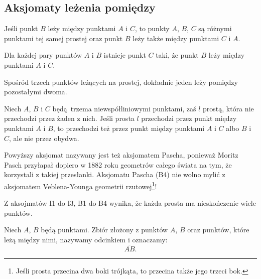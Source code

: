 %

\subsection{Aksjomaty leżenia pomiędzy}
\begin{axiom}
    Jeśli punkt $B$ leży między punktami $A$ i $C$, to punkty $A$, $B$, $C$ są różnymi punktami tej samej prostej oraz punkt $B$ leży także między punktami $C$ i $A$.
\end{axiom}

\begin{axiom}
    Dla każdej pary punktów $A$ i $B$ istnieje punkt $C$ taki, że punkt $B$ leży między punktami $A$ i $C$.
\end{axiom}

\begin{axiom}
    Spośród trzech punktów leżących na prostej, dokładnie jeden leży pomiędzy pozostałymi dwoma.
\end{axiom}

\begin{axiom}
    Niech $A$, $B$ i $C$ będą trzema niewspółliniowymi punktami, zaś $l$ prostą, która nie przechodzi przez żaden z nich.
    Jeśli prosta $l$ przechodzi przez punkt między punktami $A$ i $B$, to przechodzi też przez punkt między punktami $A$ i $C$ albo $B$ i $C$, ale nie przez obydwa.
\end{axiom}

Powyższy aksjomat nazywany jest też aksjomatem Pascha, ponieważ Moritz Pasch \cite{pasch_1882} przyłapał dopiero w 1882 roku geometrów całego świata na tym, że korzystali z takiej przesłanki.
%
%
Aksjomatu Pascha (B4) nie wolno mylić z aksjomatem Veblena-Younga geometrii rzutowej\footnote{Jeśli prosta przecina dwa boki trójkąta, to przecina także jego trzeci bok. }!

\begin{proposition}
    Z aksojmatów I1 do I3, B1 do B4 wynika, że każda prosta ma nieskończenie wiele punktów.
\end{proposition}

\begin{definition}[odcinek]
    Niech $A$, $B$ będą punktami.
    Zbiór złożony z punktów $A$, $B$ oraz punktów, które leżą między nimi, nazywamy odcinkiem i oznaczamy:
%
    \begin{equation}
        \overline{AB}.
    \end{equation}
\end{definition}

